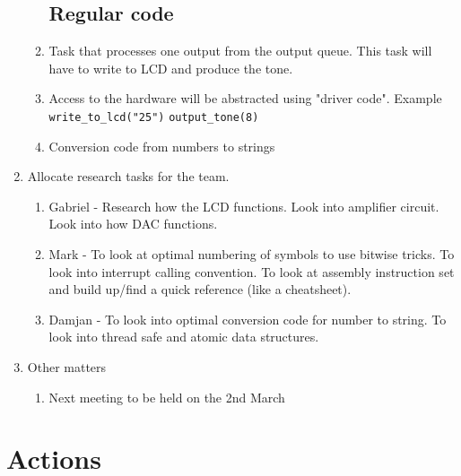 \documentclass[11pt,a4paper]{scrartcl}
\begin{document}
\begin{enumerate}
\begin{enumerate}
   \subsection{Regular code}
   \item Task that processes one output from the output queue. This task will have to write to LCD and produce the tone.
   \item Access to the hardware will be abstracted using "driver code". Example \verb!write_to_lcd("25")! \verb!output_tone(8)!
   \item Conversion code from numbers to strings
\end{enumerate}

\item Allocate research tasks for the team.
\begin{enumerate}
\item Gabriel - Research how the LCD functions. Look into amplifier circuit. Look into how DAC functions.
\item Mark - To look at optimal numbering of symbols to use bitwise tricks. To look into interrupt calling convention. To look at assembly instruction set and build up/find a quick reference (like a cheatsheet).
\item Damjan - To look into optimal conversion code for number to string. To look into thread safe and atomic data structures.
\end{enumerate}

\item Other matters
\begin{enumerate}
\item Next meeting to be held on the 2nd March
\end{enumerate}

\end{enumerate}

\section*{Actions}
\end{document}
